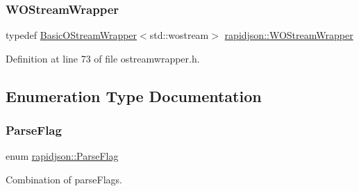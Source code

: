 \subsubsection{\texorpdfstring{WOStreamWrapper}{WOStreamWrapper}}
{\footnotesize\ttfamily typedef \mbox{\hyperlink{classrapidjson_1_1_basic_o_stream_wrapper}{Basic\+O\+Stream\+Wrapper}}$<$std\+::wostream$>$ \mbox{\hyperlink{namespacerapidjson_aed3cb4533d7293644a01ec707cf8282d}{rapidjson\+::\+W\+O\+Stream\+Wrapper}}}



Definition at line 73 of file ostreamwrapper.\+h.



\subsection{Enumeration Type Documentation}
\mbox{\label{namespacerapidjson_a81379eb4e94a0386d71d15fda882ebc9}} 
\subsubsection{\texorpdfstring{ParseFlag}{ParseFlag}}
{\footnotesize\ttfamily enum \mbox{\hyperlink{namespacerapidjson_a81379eb4e94a0386d71d15fda882ebc9}{rapidjson\+::\+Parse\+Flag}}}



Combination of parse\+Flags. 

